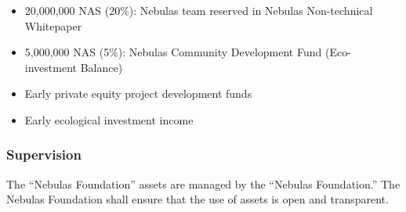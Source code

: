 \begin{itemize}
	\item 20,000,000 NAS (20\%): Nebulas team reserved in Nebulas Non-technical Whitepaper
    \item 5,000,000 NAS (5\%): Nebulas Community Development Fund (Eco-investment Balance)
	\item Early private equity project development funds
	\item Early ecological investment income
\end{itemize}

\subsubsection{Supervision}

The “Nebulas Foundation” assets are managed by the “Nebulas Foundation.” The Nebulas Foundation shall ensure that the use of assets is open and transparent.

